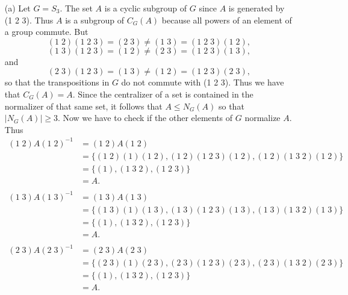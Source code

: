 \documentclass[9pt]{article}
\begin{document}
\begin{enumerate}
      \begin{enumerate}
         \item[(a)] Let $G = S_3$.
               The set $A$ is a cyclic subgroup of $G$ since $A$ is generated by
               (1 2 3). Thus $A$ is a subgroup of $C_G(A)$ because all powers of
               an element of a group commute. But
               $$(1\;2)(1\;2\;3) = (2\;3) \neq (1\;3) = (1\;2\;3)(1\;2),$$
               $$(1\;3)(1\;2\;3) = (1\;2) \neq (2\;3) = (1\;2\;3)(1\;3),$$
               and
               $$(2\;3)(1\;2\;3) = (1\;3) \neq (1\;2) = (1\;2\;3)(2\;3),$$
               so that the transpositions in $G$ do not commute with
               (1 2 3). Thus we have that $C_G(A) = A$. Since the centralizer of
               a set is contained in the normalizer of that same set, it follows
               that $A \le N_G(A)$ so that $|N_G(A)| \ge 3$.
               Now we have to check if the other elements of $G$ normalize $A$.
               Thus
               \begin{align*}
                  (1\;2)A(1\;2)^{-1} &= (1\;2)A(1\;2) \\
                     &= \{(1\;2)(1)(1\;2), (1\;2)(1\;2\;3)(1\;2),
                          (1\;2)(1\;3\;2)(1\;2)\} \\
                     &= \{(1), (1\;3\;2), (1\;2\;3)\} \\
                     &= A. \\ \\
                  (1\;3)A(1\;3)^{-1} &= (1\;3)A(1\;3) \\
                     &= \{(1\;3)(1)(1\;3), (1\;3)(1\;2\;3)(1\;3),
                          (1\;3)(1\;3\;2)(1\;3)\} \\
                     &= \{(1), (1\;3\;2), (1\;2\;3)\} \\
                     &= A. \\ \\
                  (2\;3)A(2\;3)^{-1} &= (2\;3)A(2\;3) \\
                     &= \{(2\;3)(1)(2\;3), (2\;3)(1\;2\;3)(2\;3),
                          (2\;3)(1\;3\;2)(2\;3)\} \\
                     &= \{(1), (1\;3\;2), (1\;2\;3)\} \\
                     &= A.
               \end{align*}
               

\end{enumerate}
\end{enumerate}
\end{document}
